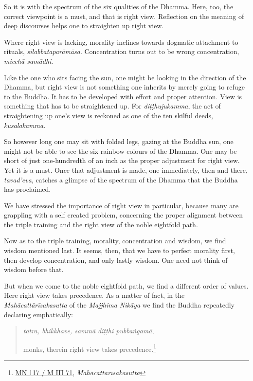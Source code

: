 So it is with the spectrum of the six qualities of the Dhamma. Here, too, the correct viewpoint is a must, and that is right view. Reflection on the meaning of deep discourses helps one to straighten up right view.

Where right view is lacking, morality inclines towards dogmatic attachment to rituals, \emph{sīlabbataparāmāsa}. Concentration turns out to be wrong concentration, \emph{micchā samādhi}.

Like the one who sits facing the sun, one might be looking in the direction of the Dhamma, but right view is not something one inherits by merely going to refuge to the Buddha. It has to be developed with effort and proper attention. View is something that has to be straightened up. For \emph{diṭṭhujukamma}, the act of straightening up one's view is reckoned as one of the ten skilful deeds, \emph{kusalakamma}.

So however long one may sit with folded legs, gazing at the Buddha sun, one might not be able to see the six rainbow colours of the Dhamma. One may be short of just one-hundredth of an inch as the proper adjustment for right view. Yet it is a must. Once that adjustment is made, one immediately, then and there, \emph{tavad'eva}, catches a glimpse of the spectrum of the Dhamma that the Buddha has proclaimed.

We have stressed the importance of right view in particular, because many are grappling with a self created problem, concerning the proper alignment between the triple training and the right view of the noble eightfold path.

Now as to the triple training, morality, concentration and wisdom, we find wisdom mentioned last. It seems, then, that we have to perfect morality first, then develop concentration, and only lastly wisdom. One need not think of wisdom before that.

But when we come to the noble eightfold path, we find a different order of values. Here right view takes precedence. As a matter of fact, in the \emph{Mahācattārīsakasutta} of the \emph{Majjhima Nikāya} we find the Buddha repeatedly declaring emphatically:

\begin{quote}
\emph{tatra, bhikkhave, sammā diṭṭhi pubbaṅgamā},

monks, therein right view takes precedence.\footnote{\href{https://suttacentral.net/mn117/pli/ms}{MN 117 / M III 71}, \emph{Mahācattārīsakasutta}}
\end{quote}

